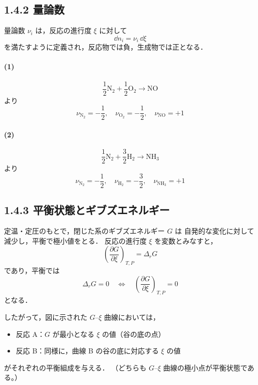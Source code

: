 \documentclass[a4paper,12pt]{jlreq}
\begin{document}
\subsection*{1.4.2 量論数}

量論数 $\nu_i$ は，反応の進行度 $\xi$ に対して
\[
 \dd n_i = \nu_i\,\dd\xi
\]
を満たすように定義され，反応物では負，生成物では正となる．

\paragraph{(1)}
\[
 \frac{1}{2}\mathrm{N_2} + \frac{1}{2}\mathrm{O_2} \rightarrow \mathrm{NO}
\]
より
\[
 \boxed{
 \nu_{\mathrm{N_2}} = -\frac{1}{2},\quad
 \nu_{\mathrm{O_2}} = -\frac{1}{2},\quad
 \nu_{\mathrm{NO}} = +1
 }
\]

\paragraph{(2)}
\[
 \frac{1}{2}\mathrm{N_2} + \frac{3}{2}\mathrm{H_2} \rightarrow \mathrm{NH_3}
\]
より
\[
 \boxed{
 \nu_{\mathrm{N_2}} = -\frac{1}{2},\quad
 \nu_{\mathrm{H_2}} = -\frac{3}{2},\quad
 \nu_{\mathrm{NH_3}} = +1
 }
\]

\subsection*{1.4.3 平衡状態とギブズエネルギー}

定温・定圧のもとで，閉じた系のギブズエネルギー $G$ は
自発的な変化に対して減少し，平衡で極小値をとる．  
反応の進行度 $\xi$ を変数とみなすと，
\[
 \left(\frac{\partial G}{\partial \xi}\right)_{T,P} = \Delta_r G
\]
であり，平衡では
\[
 \boxed{
 \Delta_r G = 0
 \quad\Leftrightarrow\quad
 \left(\dfrac{\partial G}{\partial \xi}\right)_{T,P} = 0
 }
\]
となる．

したがって，図に示された $G$–$\xi$ 曲線においては，
\begin{itemize}
  \item 反応 A：$G$ が最小となる $\xi$ の値（谷の底の点）
  \item 反応 B：同様に，曲線 B の谷の底に対応する $\xi$ の値
\end{itemize}
がそれぞれの平衡組成を与える．  
（どちらも $G$–$\xi$ 曲線の極小点が平衡状態である。）
\end{document}
